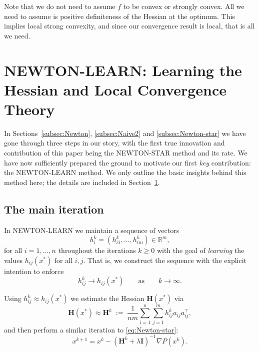 \documentclass[12pt]{article}
\newcommand{\squeeze}{}
\newcommand{\eqdef}{\; { := }\;}
\newcommand{\R}{\mathbb{R}}
\newcommand{\newalpha}{h}
\newcommand{\mH}{\mathbf{H}}
\newcommand{\mI}{\mathbf{I}}
\begin{document}
Note that we do not need to assume $f$ to be convex or strongly convex. All we need to assume is positive definiteness of the Hessian at the optimum. This implies local strong convexity, and since our convergence result is local, that is all we need.

\section{{\sf NEWTON-LEARN}: Learning the Hessian and Local Convergence Theory} \label{sec:Newton-learn}

In Sections~\ref{subsec:Newton}, \ref{subsec:Naive2} and \ref{subsec:Newton-star} we have gone through three steps in our story,  with the first true innovation and contribution of this paper being the {\sf NEWTON-STAR} method and its rate. We have now sufficiently prepared the ground to motivate our first {\em key} contribution: the {\sf NEWTON-LEARN} method. We only outline the basic insights behind this method here; the details are included in Section~\ref{sec:Newton-learn}.  



\subsection{The main iteration}
In {\sf NEWTON-LEARN} we maintain a sequence of vectors \begin{equation}\label{eq:h_i^k}h_i^k=(h_{i1}^k,\dots, h_{im}^k) \in \R^m, \nonumber \end{equation} for all $i=1,\dots,n$ throughout the iterations $k\geq 0$  with the goal of {\em learning} the values $\newalpha_{ij}(x^*)$ for all $i,j$. That is, we construct the sequence with the explicit intention to enforce 
\begin{equation}\label{eq:learn} h_{ij}^k \to \newalpha_{ij}(x^*) \qquad \text{as} \qquad k\to \infty.\end{equation}

Using $h_{ij}^k \approx \newalpha_{ij}(x^*)$ we  estimate the Hessian $\mH(x^*)$ via
\begin{equation}\label{eq:Newton2-xx} 
\squeeze \mH(x^*) \approx \mH^k \eqdef  \frac{1}{nm}\sum \limits_{i=1}^n \sum \limits_{j=1}^m h^k_{ij}  a_{ij}a_{ij}^\top,\end{equation}
and then perform a similar iteration to \eqref{eq:Newton-star}:
\begin{equation} \label{eq:Newton-learn} x^{k+1} = x^k - \left(\mH^k + \lambda \mI\right)^{-1} \nabla P(x^k).\end{equation}
\end{document}
